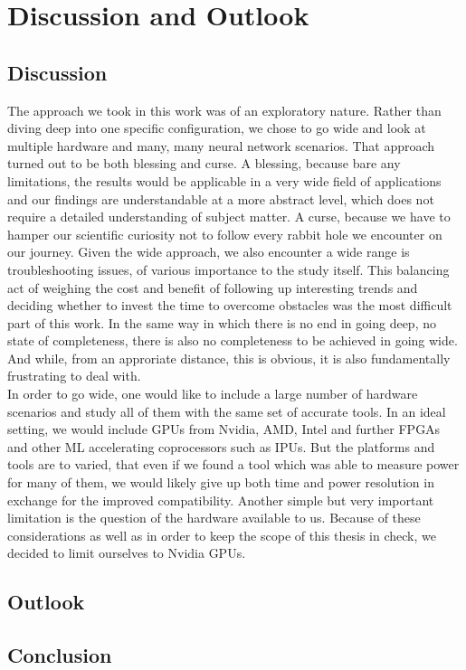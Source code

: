 \chapter{Discussion and Outlook}\label{chap:discussion}

\section{Discussion}

The approach we took in this work was of an exploratory nature. Rather than diving deep into one specific configuration, we chose to go wide and look at multiple hardware and many, many neural network scenarios. That approach turned out to be both blessing and curse. A blessing, because bare any limitations, the results would be applicable in a very wide field of applications and our findings are understandable at a more abstract level, which does not require a detailed understanding of subject matter. A curse, because we have to hamper our scientific curiosity not to follow every rabbit hole we encounter on our journey. Given the wide approach, we also encounter a wide range is troubleshooting issues, of various importance to the study itself. This balancing act of weighing the cost and benefit of following up interesting trends and deciding whether to invest the time to overcome obstacles was the most difficult part of this work. In the same way in which there is no end in going deep, no state of completeness, there is also no completeness to be achieved in going wide. And while, from an approriate distance, this is obvious, it is also fundamentally frustrating to deal with.\\
In order to go wide, one would like to include a large number of hardware scenarios and study all of them with the same set of accurate tools. In an ideal setting, we would include GPUs from Nvidia, AMD, Intel and further FPGAs and other ML accelerating coprocessors such as IPUs. But the platforms and tools are to varied, that even if we found a tool which was able to measure power for many of them, we would likely give up both time and power resolution in exchange for the improved compatibility. Another simple but very important limitation is the question of the hardware available to us. Because of these considerations as well as in order to keep the scope of this thesis in check, we decided to limit ourselves to Nvidia GPUs. 

\section{Outlook}

\section{Conclusion}
